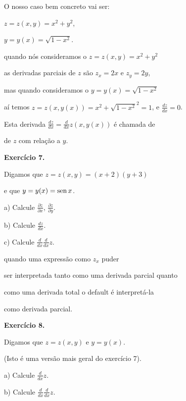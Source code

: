 \documentclass[oneside,12pt]{article}
\begin{document}
\msk

O nosso caso bem concreto vai ser:

$z = z(x,y) = x^2 + y^2$,

$y = y(x) = \sqrt{1 - x^2}$.

quando nós  consideramos o $z = z(x,y) = x^2 + y^2$

as derivadas parciais de $z$ são $z_x = 2x$ e $z_y = 2y$,

mas quando  consideramos o $y = y(x) = \sqrt{1 - x^2}$

aí temos $z = z(x,y(x)) = x^2 + \sqrt{1-x^2}^2 = 1$, e $\frac{dz}{dx}=0$.

\msk

Esta derivada $\frac{dz}{dx} = \frac{d}{dx} z(x,y(x))$ é chamada de

 de $z$ com relação a $y$.




\newpage


{\bf Exercício 7.}

Digamos que $z = z(x,y) = (x+2)(y+3)$

e que $y = y(x) = \operatorname{sen} x$.

a) Calcule $\frac{∂z}{∂x}$, $\frac{∂z}{∂y}$.

b) Calcule $\frac{dz}{dx}$.

c) Calcule $\frac{d}{dx}\frac{d}{dx}z$.

\msk

 quando uma expressão como $z_x$ puder

ser interpretada tanto como uma derivada parcial quanto

como uma derivada total o default é interpretá-la

como derivada parcial.


\newpage


{\bf Exercício 8.}

Digamos que $z=z(x,y)$ e $y=y(x)$.

(Isto é uma versão mais geral do exercício 7).

\ssk

a) Calcule $\frac{d}{dx}z$.

\ssk

b) Calcule $\frac{d}{dx}\frac{d}{dx}z$.
\end{document}
